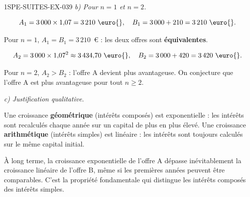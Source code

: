 \begin{corrige}{1SPE-SUITES-EX-039}
\textit{b) Pour $n = 1$ et $n = 2$.}

\[
  A_1 = 3\,000 \times 1{,}07 = 3\,210 \text{ \euro{}}, \quad B_1 = 3\,000 + 210 = 3\,210 \text{ \euro{}}.
\]

Pour $n = 1$, $A_1 = B_1 = 3\,210$~\euro{} : les deux offres sont \textbf{équivalentes}.

\[
  A_2 = 3\,000 \times 1{,}07^2 \approx 3\,434{,}70 \text{ \euro{}}, \quad B_2 = 3\,000 + 420 = 3\,420 \text{ \euro{}}.
\]


Pour $n = 2$, $A_2 > B_2$ : l'offre A devient plus avantageuse. On conjecture que l'offre A est plus avantageuse pour tout $n \geq 2$.

\textit{c) Justification qualitative.}

Une croissance \textbf{géométrique} (intérêts composés) est exponentielle : les intérêts sont recalculés chaque année sur un capital de plus en plus élevé. Une croissance \textbf{arithmétique} (intérêts simples) est linéaire : les intérêts sont toujours calculés sur le même capital initial.


À long terme, la croissance exponentielle de l'offre A dépasse inévitablement la croissance linéaire de l'offre B, même si les premières années peuvent être comparables. C'est la propriété fondamentale qui distingue les intérêts composés des intérêts simples.

\end{corrige}
